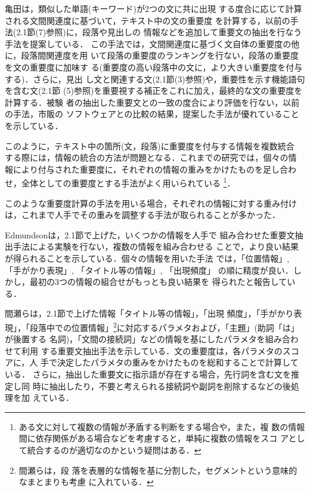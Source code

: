 亀田\cite{kameda:97:a}は，類似した単語(キーワード)が2つの文に共に出現
する度合に応じて計算される文間関連度に基づいて，テキスト中の文の重要度
を計算する，以前の手法(2.1節(7)参照)\cite{kameda:96:a}に，段落や見出しの
情報などを追加して重要文の抽出を行なう手法を提案している．
この手法では，文間関連度に基づく文自体の重要度の他に，段落間関連度を用
いて段落の重要度のランキングを行ない，段落の重要度を文の重要度に加味す
る(重要度の高い段落中の文に，より大きい重要度を付与する)．さらに，見出
し文と関連する文(2.1節(3)参照)や，重要性を示す機能語句を含む文(2.1節
(5)参照)を重要視する補正をこれに加え，最終的な文の重要度を計算する．被験
者の抽出した重要文との一致の度合により評価を行ない，以前の手法，市販の
ソフトウェアとの比較の結果，提案した手法が優れていることを示している．

このように，テキスト中の箇所(文，段落)に重要度を付与する情報を複数統合
する際には，情報の統合の方法が問題となる．これまでの研究では，個々の情
報により付与された重要度に，それぞれの情報の重みをかけたものを足し合わ
せ，全体としての重要度とする手法がよく用いられている
\footnote{ある文に対して複数の情報が矛盾する判断をする場合や，また，複
数の情報間に依存関係がある場合などを考慮すると，単純に複数の情報をスコ
アとして統合するのが適切なのかという疑問はある．}．

このような重要度計算の手法を用いる場合，それぞれの情報に対する重み付け
は，これまで人手でその重みを調整する手法が取られることが多かった．

Edmundson\cite{edmundson:69:a}は，2.1節で上げた，いくつかの情報を人手で
組み合わせた重要文抽出手法による実験を行ない，複数の情報を組み合わせる
ことで，より良い結果が得られることを示している．個々の情報を用いた手法
では，「位置情報」, 「手がかり表現」, 「タイトル等の情報」, 「出現頻度」
の順に精度が良い．しかし，最初の3つの情報の組合せがもっとも良い結果を
得られたと報告している．

間瀬ら\cite{mase:89:a}は，2.1節で上げた情報「タイトル等の情報」，「出現
頻度」，「手がかり表現」，「段落中での位置情報」\footnote{間瀬らは，段
落を表層的な情報を基に分割した，セグメントという意味的なまとまりも考慮
に入れている．}に対応するパラメタおよび，「主題」(助詞「は」が後置する
名詞)，「文間の接続詞」などの情報を基にしたパラメタを組み合わせて利用
する重要文抽出手法を示している．文の重要度は，各パラメタのスコアに，人
手で決定したパラメタの重みをかけたものを総和することで計算している．
さらに，抽出した重要文に指示語が存在する場合，先行詞を含む文を推定し同
時に抽出したり，不要と考えられる接続詞や副詞を削除するなどの後処理を加
えている．

